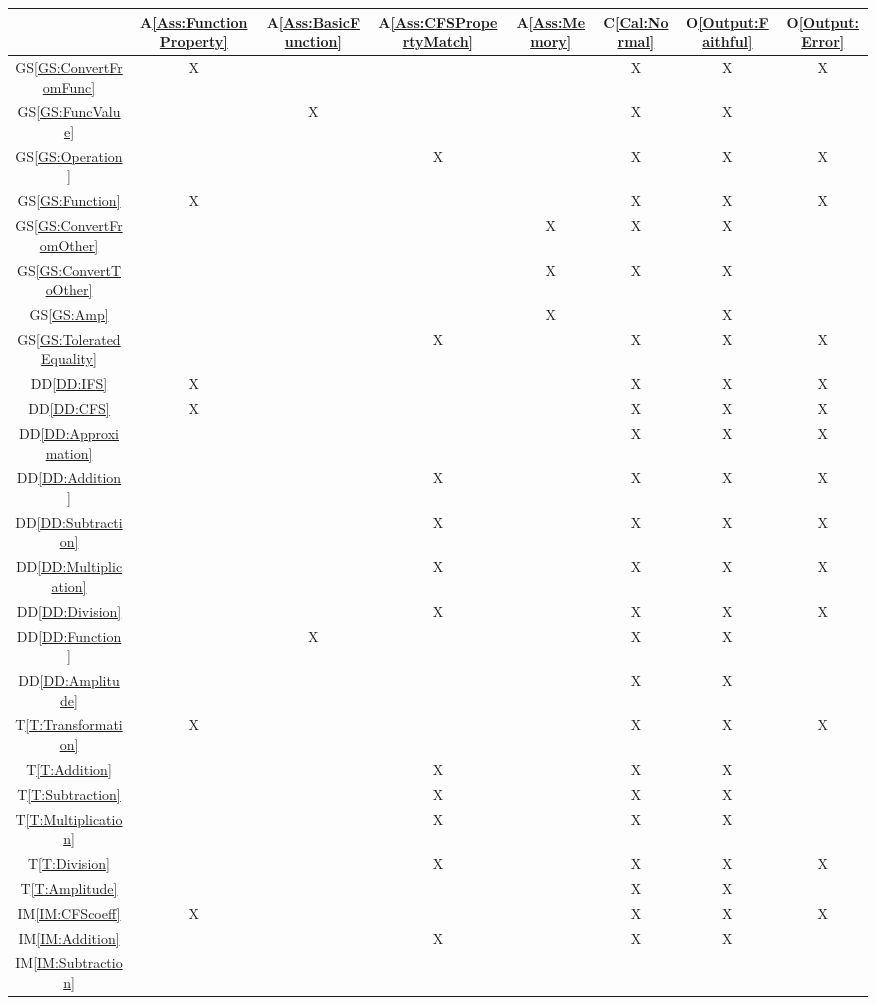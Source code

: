\documentclass[12pt]{article}
\newcommand{\ddref}[1]{DD\ref{#1}}
\newcommand{\tref}[1]{T\ref{#1}}
\newcommand{\aref}[1]{A\ref{#1}}
\newcommand{\calref}[1]{C\ref{#1}}
\newcommand{\oref}[1]{O\ref{#1}}
\newcommand{\gsref}[1]{GS\ref{#1}}
\newcommand{\iref}[1]{IM\ref{#1}}
\begin{document}
\begin{table}
	\centering
	\begin{tabular}{|c|c|c|c|c|c|c|c|}
		\hline
		&\aref{Ass:FunctionProperty}&\aref{Ass:BasicFunction}
		&\aref{Ass:CFSPropertyMatch}&\aref{Ass:Memory}
		&\calref{Cal:Normal}&\oref{Output:Faithful}
		&\oref{Output:Error}\\
		\hline
		\gsref{GS:ConvertFromFunc}
		&X& & & &X&X&X\\\hline
		\gsref{GS:FuncValue}
		& &X& & &X&X& \\\hline
		\gsref{GS:Operation}
		& & &X& &X&X&X \\\hline
		\gsref{GS:Function}
		&X& & & &X&X&X\\\hline
		\gsref{GS:ConvertFromOther}
		& & & &X&X&X& \\\hline
		\gsref{GS:ConvertToOther}
		& & & &X&X&X& \\\hline
		\gsref{GS:Amp}
		& & & &X& &X& \\\hline
		\gsref{GS:ToleratedEquality}
		& & &X& &X&X&X\\\hline
		\ddref{DD:IFS}
		&X& & & &X&X&X\\\hline
		\ddref{DD:CFS}
		&X& & & &X&X&X\\\hline
		\ddref{DD:Approximation}
		& & & & &X&X&X\\\hline
		\ddref{DD:Addition}
		& & &X& &X&X&X\\\hline
		\ddref{DD:Subtraction}
		& & &X& &X&X&X\\\hline
		\ddref{DD:Multiplication}
		& & &X& &X&X&X\\\hline
		\ddref{DD:Division}
		& & &X& &X&X&X\\\hline
		\ddref{DD:Function}
		& &X& & &X&X& \\\hline
		\ddref{DD:Amplitude}
		& & & & &X&X& \\\hline
		\tref{T:Transformation}
		&X& & & &X&X&X\\\hline
		\tref{T:Addition}
		& & &X& &X&X& \\\hline
		\tref{T:Subtraction}
		& & &X& &X&X& \\\hline
		\tref{T:Multiplication}
		& & &X& &X&X& \\\hline
		\tref{T:Division}
		& & &X& &X&X&X\\\hline
		\tref{T:Amplitude}
		& & & & &X&X& \\\hline
		\iref{IM:CFScoeff}
		&X& & & &X&X&X\\\hline
		\iref{IM:Addition}
		& & &X& &X&X& \\\hline
		\iref{IM:Subtraction}

\end{tabular}
\end{table}
\end{document}
